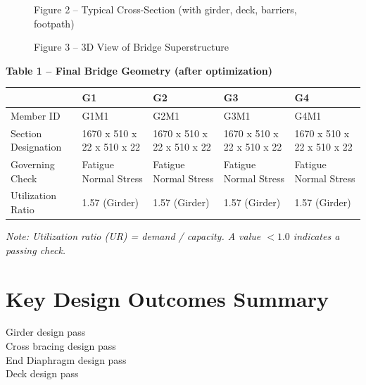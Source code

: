 \documentclass[12pt,a4paper]{report}
\numberwithin{table}{chapter}
\numberwithin{figure}{chapter}
\begin{document}
\newpage

\begin{figure}[H]
\centering
{}
\caption*{Figure 2 -- Typical Cross-Section (with girder, deck, barriers, footpath)}
\end{figure}

\begin{figure}[H]
\centering
{}
\caption*{Figure 3 -- 3D View of Bridge Superstructure}
\end{figure}

\noindent\textbf{Table 1 -- Final Bridge Geometry (after optimization)}

\vspace{0.4em}
\noindent
\begin{tabular}{|C{2.8cm}|C{3.0cm}|C{3.0cm}|C{3.0cm}|C{3.0cm}|}
\hline
  \textbf{} &
  \textbf{G1} &
  \textbf{G2} &
  \textbf{G3} &
  \textbf{G4} \\
\hline
Member ID & G1M1 & G2M1 & G3M1 & G4M1 \\
\hline
Section Designation & 1670 x 510 x 22 x 510 x 22 & 1670 x 510 x 22 x 510 x 22 & 1670 x 510 x 22 x 510 x 22 & 1670 x 510 x 22 x 510 x 22 \\
\hline
Governing Check & Fatigue Normal Stress & Fatigue Normal Stress & Fatigue Normal Stress & Fatigue Normal Stress \\
\hline
Utilization Ratio & 1.57 (Girder) & 1.57 (Girder) & 1.57 (Girder) & 1.57 (Girder) \\
\hline
\end{tabular}

\vspace{0.4em}
\noindent\textit{Note: Utilization ratio (UR) = demand / capacity. A value $< 1.0$ indicates a passing check.}

\vspace{1em}

\section*{Key Design Outcomes Summary}
\label{sec:key-outcomes}

\noindent Girder design pass \\
Cross bracing design pass \\
End Diaphragm design pass \\
Deck design pass
\end{document}
